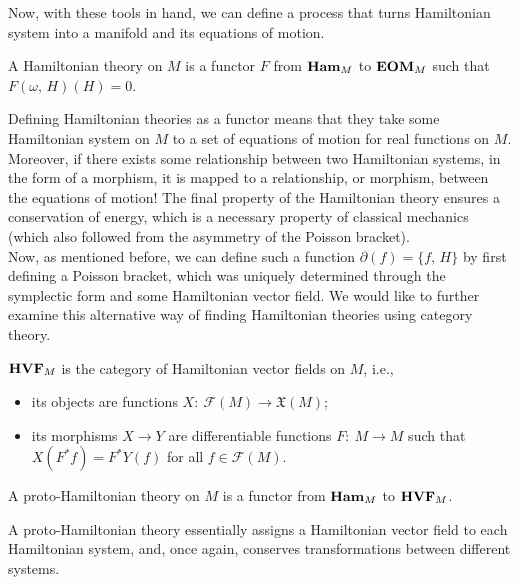 \documentclass{article}
\newcommand{\category}[1]{{\normalfont\textbf{#1}}}
\begin{document}
\begin{multicols}{2}
	Now, with these tools in hand, we can define a process that turns Hamiltonian system into a manifold and its equations of motion.
	\begin{definition}
		A Hamiltonian theory on \(M\) is a functor \(F\) from \(\category{Ham}_M\) to \(\category{EOM}_M\) such that \(F(\omega,\,H)(H) = 0\).
	\end{definition}
	Defining Hamiltonian theories as a functor means that they take some Hamiltonian system on \(M\) to a set of equations of motion for real functions on \(M\). 
	Moreover, if there exists some relationship between two Hamiltonian systems, in the form of a morphism, it is mapped to a relationship, or morphism, between the equations of motion!
	The final property of the Hamiltonian theory ensures a conservation of energy, which is a necessary property of classical mechanics (which also followed from the asymmetry of the Poisson bracket).\\
	Now, as mentioned before, we can define such a function \(\partial(f) = \{f,\,H\}\) by first defining a Poisson bracket, which was uniquely determined through the symplectic form and some Hamiltonian vector field. We would like to further examine this alternative way of finding Hamiltonian theories using category theory.
	\begin{definition}
		\(\category{HVF}_M\) is the category of Hamiltonian vector fields on \(M\), i.e.,
		\begin{itemize}
			\item its objects are functions \(X:\ \mathcal{F}(M)\to \mathfrak{X}(M)\);
			\item its morphisms \(X\to Y\) are differentiable functions \(F:\ M\to M\) such that \(X(F^*f) = F^*Y(f)\) for all \(f\in\mathcal{F}(M)\).
		\end{itemize}
	\end{definition}
	\begin{definition}
		A proto-Hamiltonian theory on \(M\) is a functor from \(\category{Ham}_M\) to \(\category{HVF}_M\).
	\end{definition}
	A proto-Hamiltonian theory essentially assigns a Hamiltonian vector field to each Hamiltonian system, and, once again, conserves transformations between different systems.
\end{multicols}
\end{document}
